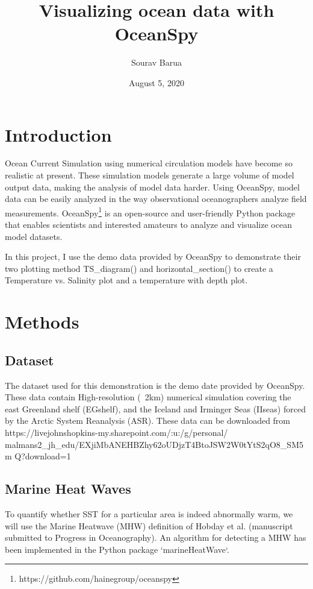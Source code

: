 \documentclass[12pt, letterpaper]{article}
\title{Visualizing ocean data with OceanSpy}
\author{Sourav Barua}
\date{August 5, 2020}
\begin{document}
\maketitle

\section{Introduction}
Ocean Current Simulation using numerical circulation models have become so realistic at present. These simulation models generate a large volume of model output data, making the analysis of model data harder. Using OceanSpy, model data can be easily analyzed in the way observational oceanographers analyze field measurements.  OceanSpy\footnote{https://github.com/hainegroup/oceanspy} is an open-source and user-friendly Python package that enables scientists and interested amateurs to analyze and visualize ocean model datasets.

In this project, I use the demo data provided by OceanSpy to demonstrate their two plotting method TS\_diagram() and horizontal\_section() to create a Temperature vs. Salinity plot and a temperature with depth plot. 
 


\section{Methods}

\subsection{Dataset}
The dataset used for this demonstration is the demo date provided by OceanSpy. These data contain High-resolution (~2km) numerical simulation covering the east Greenland shelf (EGshelf), and the Iceland and Irminger Seas (IIseas) forced by the Arctic System Reanalysis (ASR). These data can be downloaded from https://livejohnshopkins-my.sharepoint.com/:u:/g/personal/
malmans2\_jh\_edu/EXjiMbANEHBZhy62oUDjzT4BtoJSW2W0tYtS2qO8\_SM5m
Q?download=1



\subsection{Marine Heat Waves}

To quantify whether SST for a particular area is indeed abnormally warm, we will use the Marine Heatwave (MHW) definition of Hobday et al. (manuscript submitted to Progress in Oceanography).  An algorithm for detecting a MHW has been implemented in the Python package `marineHeatWave`.
\end{document}
